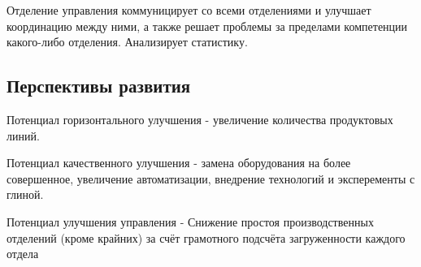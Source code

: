 \documentclass[16pt,a4paper]{article}
\begin{document}
Отделение управления коммуницирует со всеми отделениями и улучшает координацию между ними, а также решает проблемы за пределами компетенции какого-либо отделения. Анализирует статистику.

\subsection{Перспективы развития}
Потенциал горизонтального улучшения - увеличение количества продуктовых линий.

Потенциал качественного улучшения - замена оборудования на более совершенное, увеличение автоматизации, внедрение технологий и эксперементы с глиной.

Потенциал улучшения управления - Снижение простоя производственных отделений (кроме крайних) за счёт грамотного подсчёта загруженности каждого отдела
\end{document}

